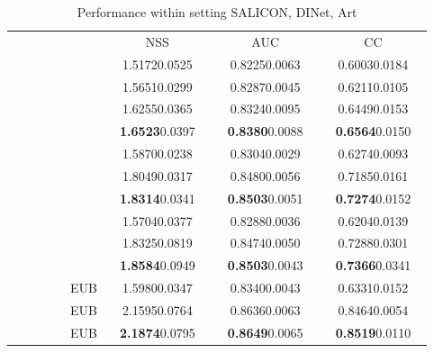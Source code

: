 \documentclass[runningheads]{llncs}
\begin{document}
\begin{table}[!t]
	\centering
	\caption{Performance within setting SALICON, DINet, Art}
	\footnotesize
\begin{tabular}{lcccc}
		\toprule
		
		& & NSS & AUC & CC \\
		\cmidrule(lr){3-3} \cmidrule(lr){4-4} \cmidrule(lr){5-5} 
		 &  & ~~1.51720.0525~~ & ~~0.82250.0063~~ & ~~0.60030.0184~~ \\ \midrule
		
~~~~~~~ &  & 1.56510.0299 & 0.82870.0045 & 0.62110.0105 \\
		 &  & 1.62550.0365 & 0.83240.0095 & 0.64490.0153 \\
		 &  & \textbf{1.6523}0.0397 & \textbf{0.8380}0.0088 & \textbf{0.6564}0.0150 \\ \midrule
		
 &  & 1.58700.0238 & 0.83040.0029 & 0.62740.0093  \\
		 &  & 1.80490.0317 & 0.84800.0056 & 0.71850.0161  \\
		 &  & \textbf{1.8314}0.0341 & \textbf{0.8503}0.0051 & \textbf{0.7274}0.0152 \\ \midrule
		
 &  & 1.57040.0377 & 0.82880.0036 & 0.62040.0139  \\
		 &  & 1.83250.0819 & 0.84740.0050 & 0.72880.0301  \\
		 &  & \textbf{1.8584}0.0949 & \textbf{0.8503}0.0043 & \textbf{0.7366}0.0341 \\ \midrule
		
 & EUB & 1.59800.0347 & 0.83400.0043 & 0.63310.0152 \\
		 & EUB & 2.15950.0764 & 0.86360.0063 & 0.84640.0054 \\
		 & EUB & \textbf{2.1874}0.0795 & \textbf{0.8649}0.0065 & \textbf{0.8519}0.0110 \\
		\bottomrule	
	\end{tabular}
	\label{tbl:s_d_a_sup}
\end{table}




%
 
\newpage



\end{document}
